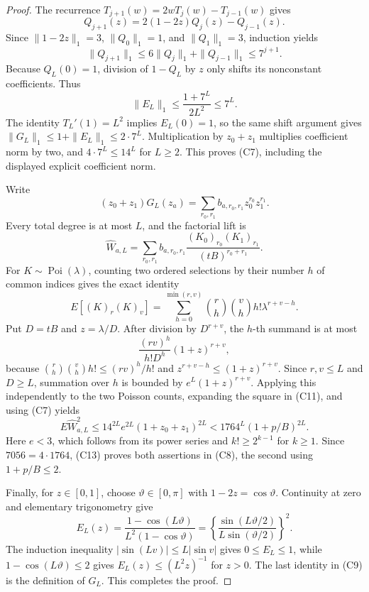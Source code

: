 \documentclass{article}
\begin{document}
\begin{proof}
The recurrence \(T_{j+1}(w)=2wT_j(w)-T_{j-1}(w)\) gives
\[
 Q_{j+1}(z)=2(1-2z)Q_j(z)-Q_{j-1}(z).
\]
Since \(\|1-2z\|_1=3\), \(\|Q_0\|_1=1\), and \(\|Q_1\|_1=3\), induction yields
\[
 \|Q_{j+1}\|_1\le6\|Q_j\|_1+\|Q_{j-1}\|_1\le7^{j+1}.             \tag{C10}
\]
Because \(Q_L(0)=1\), division of \(1-Q_L\) by \(z\) only shifts its nonconstant coefficients.  Thus
\[
 \|E_L\|_1\le\frac{1+7^L}{2L^2}\le7^L.
\]
The identity \(T_L'(1)=L^2\) implies \(E_L(0)=1\), so the same shift argument gives \(\|G_L\|_1\le1+\|E_L\|_1\le2\cdot7^L\).  Multiplication by \(z_0+z_1\) multiplies coefficient norm by two, and \(4\cdot7^L\le14^L\) for \(L\ge2\).  This proves (C7), including the displayed explicit coefficient norm.

Write
\[
 (z_0+z_1)G_L(z_a)=\sum_{r_0,r_1}b_{a,r_0,r_1}z_0^{r_0}z_1^{r_1}.
\]
Every total degree is at most \(L\), and the factorial lift is
\[
 \widehat W_{a,L}=\sum_{r_0,r_1}b_{a,r_0,r_1}
 \frac{(K_0)_{r_0}(K_1)_{r_1}}{(tB)^{r_0+r_1}}.                    \tag{C11}
\]
For \(K\sim\operatorname{Poi}(\lambda)\), counting two ordered selections by their number \(h\) of common indices gives the exact identity
\[
 E[(K)_r(K)_v]=\sum_{h=0}^{\min(r,v)}\binom rh\binom vh h!\lambda^{r+v-h}. \tag{C12}
\]
Put \(D=tB\) and \(z=\lambda/D\).  After division by \(D^{r+v}\), the \(h\)-th summand is at most
\[
 \frac{(rv)^h}{h!D^h}(1+z)^{r+v},
\]
because \(\binom rh\binom vh h!\le(rv)^h/h!\) and \(z^{r+v-h}\le(1+z)^{r+v}\).  Since \(r,v\le L\) and \(D\ge L\), summation over \(h\) is bounded by \(e^L(1+z)^{r+v}\).  Applying this independently to the two Poisson counts, expanding the square in (C11), and using (C7) yields
\[
 E\widehat W_{a,L}^{2}
 \le14^{2L}e^{2L}(1+z_0+z_1)^{2L}
 <1764^L(1+p/B)^{2L}.                                               \tag{C13}
\]
Here \(e<3\), which follows from its power series and \(k!\ge2^{k-1}\) for \(k\ge1\).  Since \(7056=4\cdot1764\), (C13) proves both assertions in (C8), the second using \(1+p/B\le2\).

Finally, for \(z\in[0,1]\), choose \(\vartheta\in[0,\pi]\) with \(1-2z=\cos\vartheta\).  Continuity at zero and elementary trigonometry give
\[
 E_L(z)=\frac{1-\cos(L\vartheta)}{L^2(1-\cos\vartheta)}
 =\left\{\frac{\sin(L\vartheta/2)}{L\sin(\vartheta/2)}\right\}^{\!2}.
\]
The induction inequality \(|\sin(Lv)|\le L|\sin v|\) gives \(0\le E_L\le1\), while \(1-\cos(L\vartheta)\le2\) gives \(E_L(z)\le(L^2z)^{-1}\) for \(z>0\).  The last identity in (C9) is the definition of \(G_L\).  This completes the proof.
\end{proof}
\end{document}
